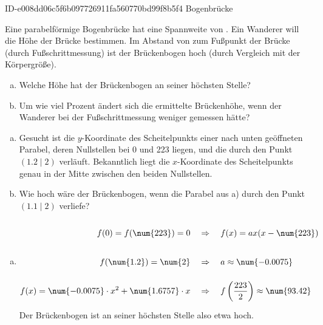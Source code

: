 \begin{exercise}
      {ID-e008dd06c5f6b097726911fa560770bd99f8b5f4}
      {Bogenbrücke}
  \ifproblem\problem\par
    Eine parabelförmige Bogenbrücke hat eine Spannweite von .
    Ein Wanderer will die Höhe der Brücke bestimmen. Im Abstand von
     zum Fußpunkt der Brücke (durch Fußschrittmessung) ist der
    Brückenbogen  hoch (durch Vergleich mit der Körpergröße).
    \begin{enumerate}[a)]
      \item Welche Höhe hat der Brückenbogen an seiner höchsten Stelle?
      \item Um wie viel Prozent ändert sich die ermittelte Brückenhöhe, wenn
            der Wanderer bei der Fußschrittmessung  weniger gemessen
            hätte?
    \end{enumerate}
  \fi
  \ifoutline\outline\par
    \begin{enumerate}[a)]
      \item Gesucht ist die $y$-Koordinate des Scheitelpunkts einer nach
            unten geöffneten Parabel, deren Nullstellen bei \num{0} und \num{223}
            liegen, und die durch den Punkt $(\num{1.2}\mid\num{2})$ verläuft.
            Bekanntlich liegt die $x$-Koordinate des Scheitelpunkts genau in
            der Mitte zwischen den beiden Nullstellen.
      \item Wie hoch wäre der Brückenbogen, wenn die Parabel aus a) durch den Punkt
            $(\num{1.1}\mid\num{2})$ verliefe?
    \end{enumerate}
  \fi
  \ifoutcome\outcome\par
    \begin{enumerate}[a)]
      \newcommand{\vstrut}{\rule[-2.75ex]{0pt}{7ex}}%
      \setlength{\abovedisplayskip}{0pt}%
      \item \begin{equation*}
                \begin{split}
                                            f(0)=f(\num{223})=0 \quad&\vstrut\Rightarrow\quad f(x)=ax(x-\num{223})  \\
                                           f(\num{1.2})=\num{2} \quad&\vstrut\Rightarrow\quad a\approx\num{-0.0075} \\
                f(x)=\num{-0.0075}\cdot x^2+\num{1.6757}\cdot x \quad&\vstrut\Rightarrow\quad f\left(\frac{223}{2}\right)\approx\num{93.42}
              \end{split}
            \end{equation*}
            Der Brückenbogen ist an seiner höchsten Stelle also etwa  hoch.


\end{enumerate}
\end{exercise}
